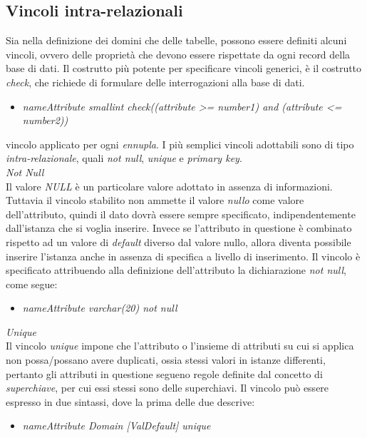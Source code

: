 \documentclass{article}
\begin{document}
\subsection*{Vincoli intra-relazionali}
\large
Sia nella definizione dei domini che delle tabelle, possono essere definiti alcuni vincoli, ovvero delle proprietà che devono essere rispettate da ogni record della base di dati. Il costrutto più potente per specificare vincoli generici, è il costrutto \textit{check}, che richiede di formulare delle interrogazioni alla base di dati.
\begin{itemize}[label={ }, leftmargin=1cm]
    \item \textit{nameAttribute smallint check((attribute >= number1) and (attribute <= number2))}
\end{itemize}
vincolo applicato per ogni \textit{ennupla}. I più semplici vincoli adottabili sono di tipo \textit{intra-relazionale}, quali \textit{not null}, \textit{unique} e \textit{primary key}.\vspace*{14pt}\\
\textit{Not Null}\\Il valore \textit{NULL} è un particolare valore adottato in assenza di informazioni. Tuttavia il vincolo stabilito non ammette il valore \textit{nullo} come valore dell'attributo, quindi il dato dovrà essere sempre specificato, indipendentemente dall'istanza che si voglia inserire. Invece se l'attributo in questione è combinato rispetto ad un valore di \textit{default} diverso dal valore nullo, allora diventa possibile inserire l'istanza anche in assenza di specifica a livello di inserimento. Il vincolo è specificato attribuendo alla definizione dell'attributo la dichiarazione \textit{not null}, come segue:
\begin{itemize}[label={ }, leftmargin=1cm]
    \itemsep0em
    \item \textit{nameAttribute varchar(20) not null}
\end{itemize}
\textit{Unique}\\Il vincolo \textit{unique} impone che l'attributo o l'insieme di attributi su cui si applica non possa/possano avere duplicati, ossia stessi valori in istanze differenti, pertanto gli attributi in questione segueno regole definite dal concetto di \textit{superchiave}, per cui essi stessi sono delle superchiavi. Il vincolo può essere espresso in due sintassi, dove la prima delle due descrive:
\begin{itemize}[label={ }, leftmargin=1cm]
    \item \textit{nameAttribute Domain [ValDefault] unique}
\end{itemize}
\end{document}
